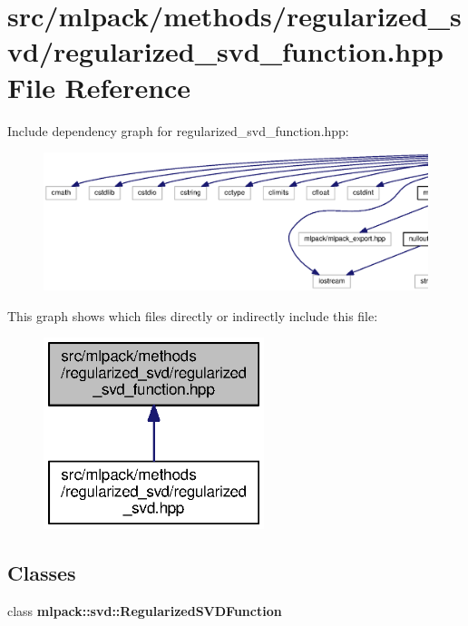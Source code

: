 \section{src/mlpack/methods/regularized\+\_\+svd/regularized\+\_\+svd\+\_\+function.hpp File Reference}
\label{regularized__svd__function_8hpp}
Include dependency graph for regularized\+\_\+svd\+\_\+function.\+hpp\+:
\nopagebreak
\begin{figure}[H]
\begin{center}
\leavevmode
\includegraphics[width=350pt]{regularized__svd__function_8hpp__incl}
\end{center}
\end{figure}
This graph shows which files directly or indirectly include this file\+:
\nopagebreak
\begin{figure}[H]
\begin{center}
\leavevmode
\includegraphics[width=182pt]{regularized__svd__function_8hpp__dep__incl}
\end{center}
\end{figure}
\subsection*{Classes}
\begin{DoxyCompactItemize}
\item 
class {\bf mlpack\+::svd\+::\+Regularized\+S\+V\+D\+Function}
\end{DoxyCompactItemize}
